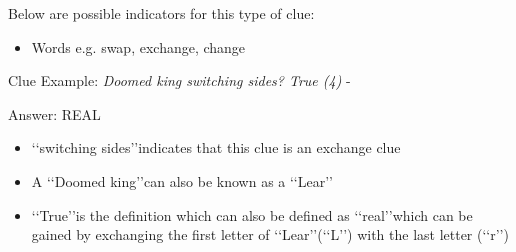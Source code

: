 Below are possible indicators for this type of clue:
\begin{itemize} 
	\item Words e.g. swap, exchange, change 
\\
\end{itemize}



Clue Example: \emph{Doomed king switching sides? True (4)}  - \citep{shuchiExchange09}

Answer: REAL 

\begin{itemize}
	\item \lq\lq switching sides\rq\rq indicates that this clue is an exchange clue 
	\item A \lq\lq Doomed king\rq\rq can also be known as a \lq\lq Lear\rq\rq
	\item \lq\lq True\rq\rq is the definition which can also be defined as \lq\lq real\rq\rq which can be gained by exchanging the first letter of \lq\lq Lear\rq\rq (\lq\lq L\rq\rq) with the last letter (\lq\lq r\rq\rq) 
\end{itemize}